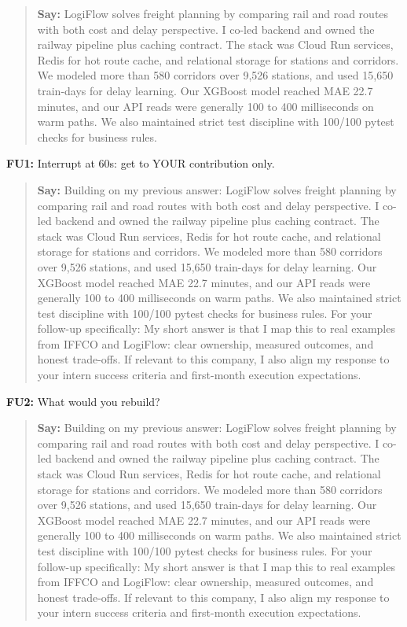 \documentclass[9pt,a4paper]{article}
\begin{document}
\begin{quote}\small\textbf{Say:} LogiFlow solves freight planning by comparing rail and road routes with both cost and delay perspective. I co-led backend and owned the railway pipeline plus caching contract. The stack was Cloud Run services, Redis for hot route cache, and relational storage for stations and corridors. We modeled more than 580 corridors over 9,526 stations, and used 15,650 train-days for delay learning. Our XGBoost model reached MAE 22.7 minutes, and our API reads were generally 100 to 400 milliseconds on warm paths. We also maintained strict test discipline with 100/100 pytest checks for business rules.\end{quote}
\vspace{2mm}
\textbf{FU1:} Interrupt at 60s: get to YOUR contribution only.

\begin{quote}\small\textbf{Say:} Building on my previous answer: LogiFlow solves freight planning by comparing rail and road routes with both cost and delay perspective. I co-led backend and owned the railway pipeline plus caching contract. The stack was Cloud Run services, Redis for hot route cache, and relational storage for stations and corridors. We modeled more than 580 corridors over 9,526 stations, and used 15,650 train-days for delay learning. Our XGBoost model reached MAE 22.7 minutes, and our API reads were generally 100 to 400 milliseconds on warm paths. We also maintained strict test discipline with 100/100 pytest checks for business rules. For your follow-up specifically: My short answer is that I map this to real examples from IFFCO and LogiFlow: clear ownership, measured outcomes, and honest trade-offs. If relevant to this company, I also align my response to your intern success criteria and first-month execution expectations.\end{quote}
\vspace{2mm}
\textbf{FU2:} What would you rebuild?

\begin{quote}\small\textbf{Say:} Building on my previous answer: LogiFlow solves freight planning by comparing rail and road routes with both cost and delay perspective. I co-led backend and owned the railway pipeline plus caching contract. The stack was Cloud Run services, Redis for hot route cache, and relational storage for stations and corridors. We modeled more than 580 corridors over 9,526 stations, and used 15,650 train-days for delay learning. Our XGBoost model reached MAE 22.7 minutes, and our API reads were generally 100 to 400 milliseconds on warm paths. We also maintained strict test discipline with 100/100 pytest checks for business rules. For your follow-up specifically: My short answer is that I map this to real examples from IFFCO and LogiFlow: clear ownership, measured outcomes, and honest trade-offs. If relevant to this company, I also align my response to your intern success criteria and first-month execution expectations.\end{quote}
\vspace{2mm}
\newpage
\end{document}
